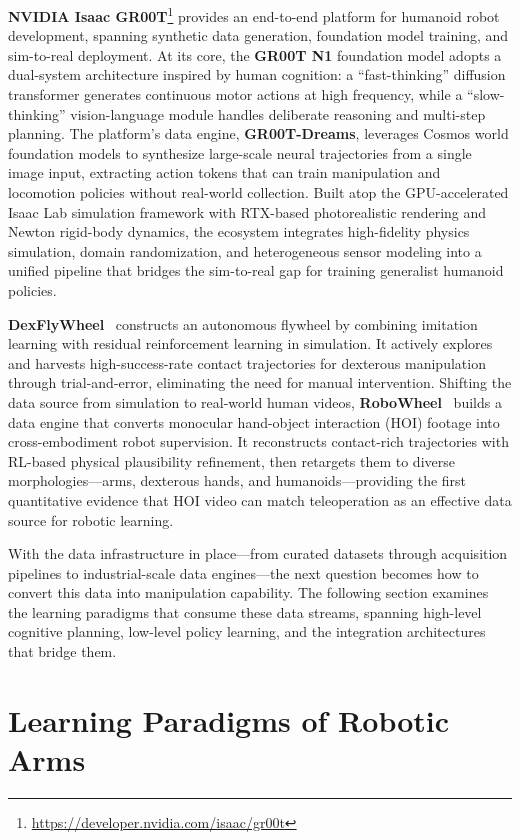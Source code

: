 \documentclass[acmsmall,screen,review,anonymous]{acmart}
\begin{document}
\textbf{NVIDIA Isaac GR00T}\footnote{\url{https://developer.nvidia.com/isaac/gr00t}} provides an end-to-end platform for humanoid robot development, spanning synthetic data generation, foundation model training, and sim-to-real deployment. At its core, the \textbf{GR00T N1} foundation model adopts a dual-system architecture inspired by human cognition: a ``fast-thinking'' diffusion transformer generates continuous motor actions at high frequency, while a ``slow-thinking'' vision-language module handles deliberate reasoning and multi-step planning. The platform's data engine, \textbf{GR00T-Dreams}, leverages Cosmos world foundation models to synthesize large-scale neural trajectories from a single image input, extracting action tokens that can train manipulation and locomotion policies without real-world collection. Built atop the GPU-accelerated Isaac Lab simulation framework with RTX-based photorealistic rendering and Newton rigid-body dynamics, the ecosystem integrates high-fidelity physics simulation, domain randomization, and heterogeneous sensor modeling into a unified pipeline that bridges the sim-to-real gap for training generalist humanoid policies.

\textbf{DexFlyWheel}~\cite{zhu2025dexflywheel} constructs an autonomous flywheel by combining imitation learning with residual reinforcement learning in simulation. It actively explores and harvests high-success-rate contact trajectories for dexterous manipulation through trial-and-error, eliminating the need for manual intervention. Shifting the data source from simulation to real-world human videos, \textbf{RoboWheel}~\cite{zhang2025robowheel} builds a data engine that converts monocular hand-object interaction (HOI) footage into cross-embodiment robot supervision. It reconstructs contact-rich trajectories with RL-based physical plausibility refinement, then retargets them to diverse morphologies---arms, dexterous hands, and humanoids---providing the first quantitative evidence that HOI video can match teleoperation as an effective data source for robotic learning.

With the data infrastructure in place---from curated datasets through acquisition pipelines to industrial-scale data engines---the next question becomes how to convert this data into manipulation capability. The following section examines the learning paradigms that consume these data streams, spanning high-level cognitive planning, low-level policy learning, and the integration architectures that bridge them.

\section{Learning Paradigms of Robotic Arms}\label{sec:embodiment_method}
\end{document}
